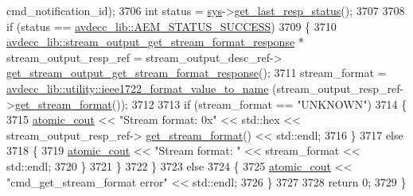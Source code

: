 \begin{DoxyCode}
      cmd\_notification\_id);
3706         \textcolor{keywordtype}{int} status = \hyperlink{classcmd__line_a485db4800e331cb4052c447fdf5d154e}{sys}->\hyperlink{classavdecc__lib_1_1system_aa63e8d1a4e51f695cdcccc9340922407}{get\_last\_resp\_status}();
3707 
3708         \textcolor{keywordflow}{if} (status == \hyperlink{namespaceavdecc__lib_affd436edb2cecd20cfd784a84f852b2bac947077909cb590b84f4b5db413080e0}{avdecc\_lib::AEM\_STATUS\_SUCCESS})
3709         \{
3710             \hyperlink{classavdecc__lib_1_1stream__output__get__stream__format__response}{avdecc\_lib::stream\_output\_get\_stream\_format\_response}
       * stream\_output\_resp\_ref = stream\_output\_desc\_ref->
      \hyperlink{classavdecc__lib_1_1stream__output__descriptor_a98069d42fe39ffe5f82626232fb99006}{get\_stream\_output\_get\_stream\_format\_response}();
3711             stream\_format = \hyperlink{namespaceavdecc__lib_1_1utility_a65f055a50d3d236b67d30c1a7b8425c8}{avdecc\_lib::utility::ieee1722\_format\_value\_to\_name}
      (stream\_output\_resp\_ref->\hyperlink{classavdecc__lib_1_1stream__output__get__stream__format__response_aba7b3a3a06d9c53ef54e43787fa46a7a}{get\_stream\_format}());
3712 
3713             \textcolor{keywordflow}{if} (stream\_format == \textcolor{stringliteral}{"UNKNOWN"})
3714             \{
3715                 \hyperlink{cmd__line_8h_a0bc38ccc65c79ba06c6fcd7b4bf554c3}{atomic\_cout} << \textcolor{stringliteral}{"Stream format: 0x"} << std::hex << stream\_output\_resp\_ref->
      \hyperlink{classavdecc__lib_1_1stream__output__get__stream__format__response_aba7b3a3a06d9c53ef54e43787fa46a7a}{get\_stream\_format}() << std::endl;
3716             \}
3717             \textcolor{keywordflow}{else}
3718             \{
3719                 \hyperlink{cmd__line_8h_a0bc38ccc65c79ba06c6fcd7b4bf554c3}{atomic\_cout} << \textcolor{stringliteral}{"Stream format: "} << stream\_format << std::endl;
3720             \}
3721         \}
3722     \}
3723     \textcolor{keywordflow}{else}
3724     \{
3725         \hyperlink{cmd__line_8h_a0bc38ccc65c79ba06c6fcd7b4bf554c3}{atomic\_cout} << \textcolor{stringliteral}{"cmd\_get\_stream\_format error"} << std::endl;
3726     \}
3727 
3728     \textcolor{keywordflow}{return} 0;
3729 \}
\end{DoxyCode}


